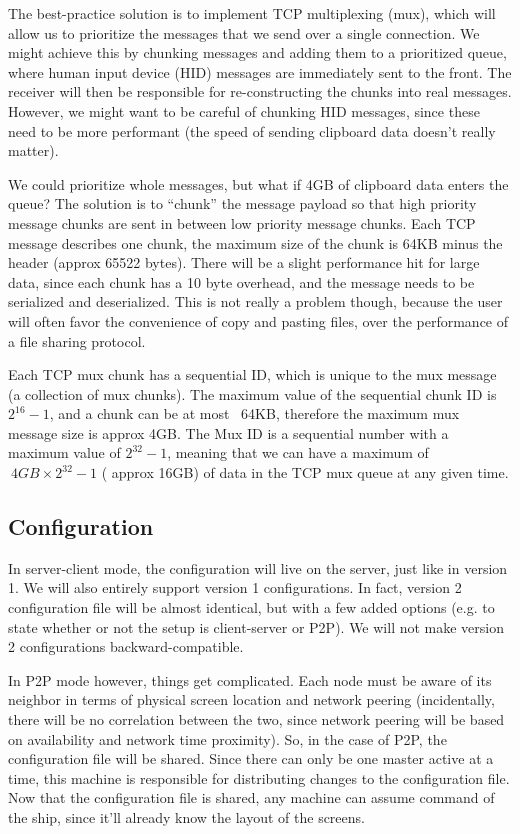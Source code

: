 The best-practice solution is to implement TCP multiplexing (mux), which will 
allow us to prioritize the messages that we send over a single connection. We
might achieve this by chunking messages and adding them to a prioritized queue,
where human input device (HID) messages are immediately sent to the front. The
receiver will then be responsible for re-constructing the chunks into real 
messages. However, we might want to be careful of chunking HID messages, since 
these need to be more performant (the speed of sending clipboard data doesn't 
really matter).

We could prioritize whole messages, but what if 4GB of clipboard data enters
the queue? The solution is to ``chunk'' the message payload so that high 
priority message chunks are sent in between low priority message chunks. Each TCP
message describes one chunk, the maximum size of the chunk is 64KB minus the 
header (approx 65522 bytes). There will be a slight performance hit for large
data, since each chunk has a 10 byte overhead, and the message needs to be 
serialized and deserialized. This is not really a problem though, because the
user will often favor the convenience of copy and pasting files, over the 
performance of a file sharing protocol.

Each TCP mux chunk has a sequential ID, which is unique to the mux message
(a collection of mux chunks). The maximum value of the sequential chunk ID is
$2^{16}-1$, and a chunk can be at most ~64KB, therefore the maximum mux message
size is approx 4GB. The Mux ID is a sequential number with a maximum value of 
$2^{32}-1$, meaning that we can have a maximum of $~4GB \times 2^{32}-1$ (
approx 16GB) of data in the TCP mux queue at any given time.

\subsection{Configuration}

In server-client mode, the configuration will live on the server, just like in
version 1. We will also entirely support version 1 configurations. In fact, 
version 2 configuration file will be almost identical, but with a few added
options (e.g. to state whether or not the setup is client-server or P2P). We 
will not make version 2 configurations backward-compatible.

In P2P mode however, things get complicated. Each node must be aware of its
neighbor in terms of physical screen location and network peering
(incidentally, there will be no correlation between the two, since network 
peering will be based on availability and network time proximity). So, in the
case of P2P, the configuration file will be shared. Since there can only be
one master active at a time, this machine is responsible for distributing
changes to the configuration file. Now that the configuration file is shared,
any machine can assume command of the ship, since it'll already know the layout
of the screens.


